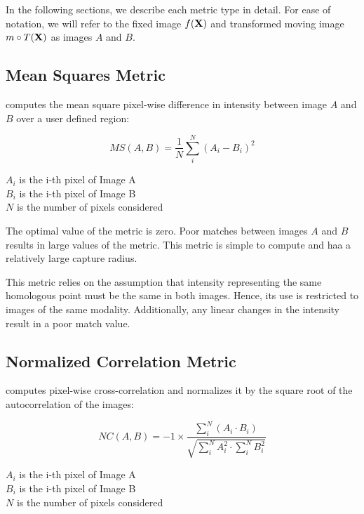 In the following sections, we describe each metric type in detail. 
For ease of notation, we will refer to the fixed image $f(\bf{X})$ 
and transformed moving image $m \circ T(\bf{X})$ as images $A$ and $B$.

\subsection{Mean Squares Metric}
\label{sec:MeanSquaresMetric}
 computes the mean square pixel-wise difference in intensity
between image $A$ and $B$ over a user defined region:

\begin{equation}
MS(A,B) = \frac{1}{N} \sum_i^N \left( A_i - B_i \right)^2
\end{equation}
\begin{center}
$A_i$ is the i-th pixel of Image A\\ 
$B_i$ is the i-th pixel of Image B\\
$N$ is the number of pixels considered
\end{center}

The optimal value of the metric is zero. Poor matches between images $A$ and
$B$ results in large values of the metric. This metric is simple to compute and
haa a relatively large capture radius.

This metric relies on the assumption that intensity representing the same
homologous point must be the same in both images. Hence, its use is restricted
to images of the same modality. Additionally, any linear changes in the
intensity result in a poor match value.

\subsection{Normalized Correlation Metric}
\label{sec:NormalizedCorrelationMetric}
 computes pixel-wise
cross-correlation and normalizes it by the square root of the autocorrelation
of the images:

\begin{equation}
NC(A,B) = -1 \times \frac{ \sum_i^N \left( A_i \cdot B_i \right) }
         { \sqrt { \sum_i^N A_i^2  \cdot \sum_i^N B_i^2 } }
\end{equation}
\begin{center}
$A_i$ is the i-th pixel of Image A\\ 
$B_i$ is the i-th pixel of Image B\\
$N$ is the number of pixels considered
\end{center}

